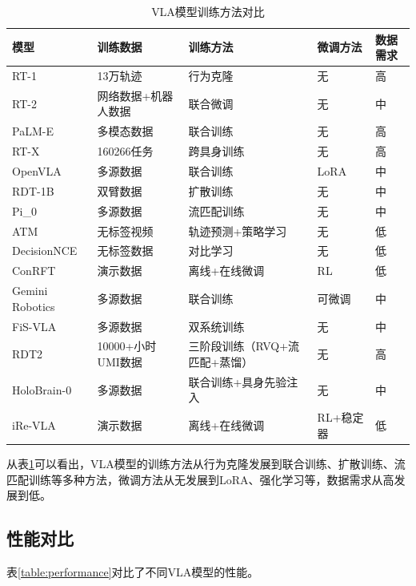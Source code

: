 \documentclass[12pt,a4paper]{article}
\begin{document}
\begin{table}[h]
\centering
\caption{VLA模型训练方法对比}\label{table:training}
\small
\begin{tabular}{lp{2cm}p{3cm}p{2cm}p{1.5cm}}
\toprule
模型 & 训练数据 & 训练方法 & 微调方法 & 数据需求 \\
\midrule
RT-1 & 13万轨迹 & 行为克隆 & 无 & 高 \\
RT-2 & 网络数据+机器人数据 & 联合微调 & 无 & 中 \\
PaLM-E & 多模态数据 & 联合训练 & 无 & 高 \\
RT-X & 160266任务 & 跨具身训练 & 无 & 高 \\
OpenVLA & 多源数据 & 联合训练 & LoRA & 中 \\
RDT-1B & 双臂数据 & 扩散训练 & 无 & 中 \\
Pi\_0 & 多源数据 & 流匹配训练 & 无 & 中 \\
ATM & 无标签视频 & 轨迹预测+策略学习 & 无 & 低 \\
DecisionNCE & 无标签数据 & 对比学习 & 无 & 低 \\
ConRFT & 演示数据 & 离线+在线微调 & RL & 低 \\
Gemini Robotics & 多源数据 & 联合训练 & 可微调 & 中 \\
FiS-VLA & 多源数据 & 双系统训练 & 无 & 中 \\
RDT2 & 10000+小时UMI数据 & 三阶段训练（RVQ+流匹配+蒸馏） & 无 & 高 \\
HoloBrain-0 & 多源数据 & 联合训练+具身先验注入 & 无 & 中 \\
iRe-VLA & 演示数据 & 离线+在线微调 & RL+稳定器 & 低 \\
\bottomrule
\end{tabular}
\end{table}

从表\ref{table:training}可以看出，VLA模型的训练方法从行为克隆发展到联合训练、扩散训练、流匹配训练等多种方法，微调方法从无发展到LoRA、强化学习等，数据需求从高发展到低。

\subsection{性能对比}

表\ref{table:performance}对比了不同VLA模型的性能。
\end{document}
